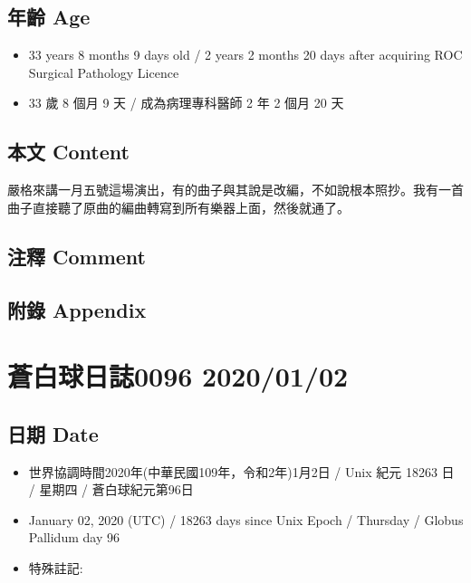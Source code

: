 \documentclass[
]{article}
\providecommand{\tightlist}{%
  \setlength{\itemsep}{0pt}\setlength{\parskip}{0pt}}
\begin{document}
\hypertarget{ux5e74ux9f61-age-31}{%
\subsection{年齡 Age}\label{ux5e74ux9f61-age-31}}

\begin{itemize}
\tightlist
\item
  33 years 8 months 9 days old / 2 years 2 months 20 days after
  acquiring ROC Surgical Pathology Licence
\item
  33 歲 8 個月 9 天 / 成為病理專科醫師 2 年 2 個月 20 天
\end{itemize}

\hypertarget{ux672cux6587-content-31}{%
\subsection{本文 Content}\label{ux672cux6587-content-31}}

嚴格來講一月五號這場演出，有的曲子與其說是改編，不如說根本照抄。我有一首曲子直接聽了原曲的編曲轉寫到所有樂器上面，然後就通了。

\hypertarget{ux6ce8ux91cb-comment-30}{%
\subsection{注釋 Comment}\label{ux6ce8ux91cb-comment-30}}

\hypertarget{ux9644ux9304-appendix-31}{%
\subsection{附錄 Appendix}\label{ux9644ux9304-appendix-31}}

\hypertarget{ux84bcux767dux7403ux65e5ux8a8c0096-20200102}{%
\section{蒼白球日誌0096
2020/01/02}\label{ux84bcux767dux7403ux65e5ux8a8c0096-20200102}}

\hypertarget{ux65e5ux671f-date-32}{%
\subsection{日期 Date}\label{ux65e5ux671f-date-32}}

\begin{itemize}
\tightlist
\item
  世界協調時間2020年(中華民國109年，令和2年)1月2日 / Unix 紀元 18263 日
  / 星期四 / 蒼白球紀元第96日
\item
  January 02, 2020 (UTC) / 18263 days since Unix Epoch / Thursday /
  Globus Pallidum day 96
\item
  特殊註記:
\end{itemize}
\end{document}
